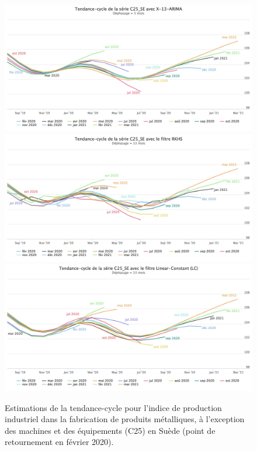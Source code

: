 \documentclass[
  11pt,
  french,
  a4paper]{article}
\newcommand\1{\mathds{1}}
\begin{document}
\begin{figure}[H]

{\centering \includegraphics[width=0.9\linewidth,]{img/simulations/c25_se_x13} \includegraphics[width=0.9\linewidth,]{img/simulations/c25_se_rkhs_timeliness} \includegraphics[width=0.9\linewidth,]{img/simulations/c25_se_lc} 

}

\caption[Estimations de la tendance-cycle pour l'indice de production industriel dans la fabrication de produits métalliques, à l'exception des machines et des équipements (C25) en Suède (point de retournement en février 2020)]{Estimations de la tendance-cycle pour l'indice de production industriel dans la fabrication de produits métalliques, à l'exception des machines et des équipements (C25) en Suède (point de retournement en février 2020).}\label{fig:c25sep1}

\footnotesize
\normalsize\end{figure}
\end{document}
